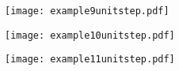 \documentclass[grid, poker_landscape]{flashcards}
\begin{document}
    \begin{flashcard}{ \begin{dmath*}  \end{dmath*} }
        \texttt{[image: example9unitstep.pdf]}
    \end{flashcard}

    \begin{flashcard}{ \begin{dmath*}  \end{dmath*} }
        \texttt{[image: example10unitstep.pdf]}
    \end{flashcard}

    \begin{flashcard}{ \begin{dmath*}  \end{dmath*} }
        \texttt{[image: example11unitstep.pdf]}
    \end{flashcard}
\end{document}
